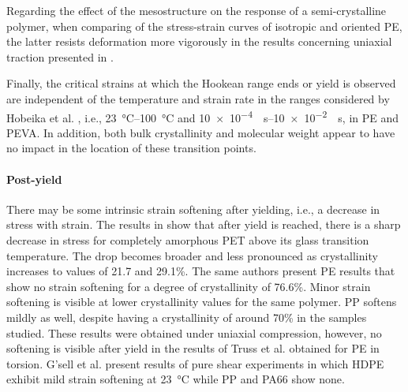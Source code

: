 Regarding the effect of the mesostructure on the response of a semi-crystalline polymer, when comparing of the stress-strain curves of isotropic and oriented PE, the latter resists deformation more vigorously in the results concerning uniaxial traction presented in \cite{naViscousForceDominatedTensileDeformation2006}.

Finally, the critical strains at which the Hookean range ends or yield is observed are independent of the temperature and strain rate in the ranges considered by Hobeika et al. \citep{hobeikaTemperatureStrainRate2000}, i.e., \SIrange{23}{100}{\celsius} and \SIrange{10e-4}{10e-2}{\per\second}, in PE and PEVA.
In addition, both bulk crystallinity and molecular weight appear to have no impact in the location of these transition points.

\paragraph{Post-yield}
There may be some intrinsic strain softening after yielding, i.e., a decrease in stress with strain.
The results in \cite{schrauwenIntrinsicDeformationBehavior2004} show that after yield is reached, there is a sharp decrease in stress for completely amorphous PET above its glass transition temperature.
The drop becomes broader and less pronounced as crystallinity increases to values of 21.7 and 29.1\%.
The same authors present PE results that show no strain softening for a degree of crystallinity of 76.6\%.
Minor strain softening is visible at lower crystallinity values for the same polymer.
PP softens mildly as well, despite having a crystallinity of around 70\% in the samples studied.
These results were obtained under uniaxial compression, however, no softening is visible after yield in the results of Truss et al. \cite{trussEffectHydrostaticPressure1981} obtained for PE in torsion.
G'sell et al. \citep{gsellApplicationPlaneSimple1983} present results of pure shear experiments in which HDPE exhibit mild strain softening at \SI{23}{\celsius} while PP and PA66 show none.

